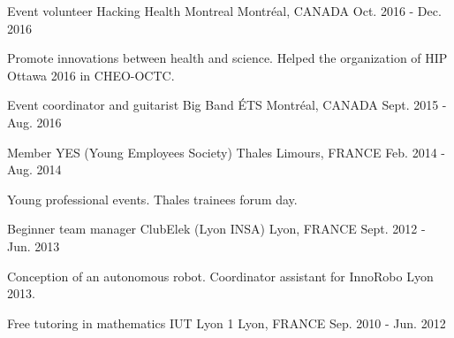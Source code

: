 


\begin{cventries}


\cventry
{Event volunteer} %
{Hacking Health Montreal} %
{Montréal, CANADA} %
{Oct. 2016 - Dec. 2016} %
{ %
\begin{cvitems}
\item {Promote innovations between health and science. Helped the organization of HIP Ottawa 2016 in CHEO-OCTC.}
\end{cvitems}
}

\cventry
{Event coordinator and guitarist} %
{Big Band ÉTS} %
{Montréal, CANADA} %
{Sept. 2015 - Aug. 2016} %
{ %
}

\vspace{-5mm}
\cventry
{Member} %
{YES (Young Employees Society) Thales} %
{Limours, FRANCE} %
{Feb. 2014 - Aug. 2014} %
{ %
\begin{cvitems}
\item {Young professional events. Thales trainees forum day.}
\end{cvitems}
}

\vspace{-3mm}
\cventry
{Beginner team manager} %
{ClubElek (Lyon INSA)} %
{Lyon, FRANCE} %
{Sept. 2012 - Jun. 2013} %
{ %
\begin{cvitems}
\item{Conception of an autonomous robot. Coordinator assistant for InnoRobo Lyon 2013.}
\end{cvitems}
}

\vspace{-3mm}
\cventry
{Free tutoring in mathematics} %
{IUT Lyon 1} %
{Lyon, FRANCE} %
{Sep. 2010 - Jun. 2012} %
{ %
}


\end{cventries}
